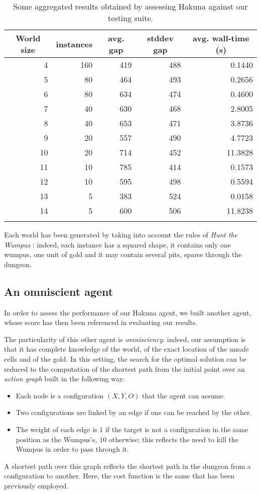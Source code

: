 \documentclass{llncs}
\newcommand{\htw}{\emph{Hunt the Wumpus }}
\begin{document}
\begin{table}[t]
	\label{tbl:test}
	\centering
	\begin{tabular}{rrrrr}
	\toprule
	\multicolumn{1}{c}{World size} & \multicolumn{1}{c}{instances} & \multicolumn{1}{c}{avg. gap} & \multicolumn{1}{c}{stddev gap} & \multicolumn{1}{c}{avg. wall-time (s)}\\
	\midrule
	4 & 160	& 419 & 488 & 0.1440 \\
	5 & 80  & 464 & 493 & 0.2656 \\
	6 & 80  & 634 & 474 & 0.4600 \\
	7 & 40  & 630 & 468 & 2.8005 \\
	8 & 40  & 653 & 471 & 3.8736 \\
	9 & 20  & 557 & 490 & 4.7723 \\
	10 & 20 & 714 & 452 & 11.3828 \\
	11 & 10 & 785 & 414 & 0.1573 \\
	12 & 10 & 595 & 498 & 0.5594 \\
	13 & 5  & 383 & 524 & 0.0158 \\
	14 & 5  & 600 & 506 & 11.8238 \\
	\bottomrule\\
	\end{tabular}
	\caption{Some aggregated results obtained by assessing Hakuna against our testing suite.}
\end{table}

Each world has been generated by taking into account the rules of \htw: indeed, each instance has a squared shape, it contains only one wumpus, one unit of gold and it may contain several pits, sparse through the dungeon.

\subsection{An omniscient agent}

In order to assess the performance of our Hakuna agent, we built another agent, whose score has then been referenced in evaluating our results.

The particularity of this other agent is \emph{omnisciency}: indeed, our assumption is that it has complete knowledge of the world, of the exact location of the unsafe cells and of the gold.
In this setting, the search for the optimal solution can be reduced to the computation of the shortest path from the initial point over an \emph{action graph} built in the following way:
\begin{itemize}
	\item Each node is a configuration $(X,Y,O)$ that the agent can assume.
	\item Two configurations are linked by an edge if one can be reached by the other.
	\item The weight of each edge is $1$ if the target is not a configuration in the same position as the Wumpus's, $10$ otherwise; this reflects the need to kill the Wumpus in order to pass through it.
\end{itemize}
A shortest path over this graph reflects the shortest path in the dungeon from a configuration to another.
Here, the cost function is the same that has been previously employed.
\end{document}
